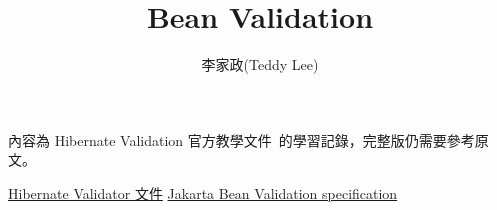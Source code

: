 \documentclass{book}
\title{Bean Validation}
\author{李家政(Teddy Lee)}
\date{{\small\zhtoday}}
\begin{document}
\maketitle

內容為 Hibernate Validation 官方教學文件~\cite{hibernate-validator-doc}的學習記錄，完整版仍需要參考原文。







\begin{thebibliography}{9}
 \href{https://hibernate.org/validator/documentation/}{Hibernate Validator 文件}
 \href{https://beanvalidation.org/2.0/spec/}{Jakarta Bean Validation specification}
\end{thebibliography}
\end{document}
